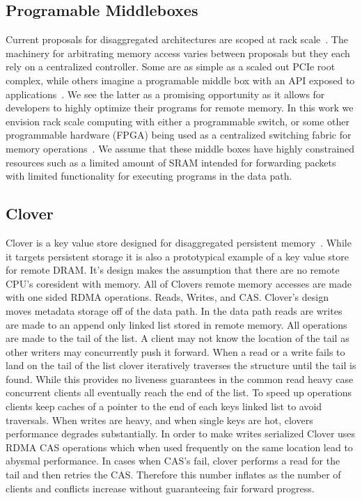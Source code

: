 \subsection{Programable Middleboxes}

Current proposals for disaggregated architectures are scoped at rack
scale~\cite{disandapp,beyond,firebox}.  The machinery for arbitrating memory
access varies between proposals but they each rely on a centralized controller.
Some are as simple as a scaled out PCIe root complex, while others imagine a
programable middle box with an API exposed to applications~\cite{disandapp}. We
see the latter as a promising opportunity as it allows for developers to highly
optimize their programs for remote memory.  In this work we envision rack scale
computing with either a programmable switch, or some other programmable hardware
(FPGA) being used as a centralized switching fabric for memory
operations~\cite{supernic}. We assume that these middle boxes have highly
constrained resources such as a limited amount of SRAM intended for forwarding
packets with limited functionality for executing programs in the data path.

\subsection{Clover}

Clover is a key value store designed for disaggregated persistent
memory~\cite{clover}. While it targets persistent storage it is also a
prototypical example of a key value store for remote DRAM. It's design makes the
assumption that there are no remote CPU's coresident with memory. All of Clovers
remote memory accesses are made with one sided RDMA operations. Reads, Writes,
and CAS. Clover's design moves metadata storage off of the data path. In the
data path reads are writes are made to an append only linked list stored in
remote memory. All operations are made to the tail of the list. A client may not
know the location of the tail as other writers may concurrently push it forward.
When a read or a write fails to land on the tail of the list clover iteratively
traverses the structure until the tail is found. While this provides no liveness
guarantees in the common read heavy case concurrent clients all eventually reach
the end of the list. To speed up operations clients keep caches of a pointer to
the end of each keys linked list to avoid traversals. When writes are heavy, and
when single keys are hot, clovers performance degrades substantially. In order
to make writes serialized Clover uses RDMA CAS operations which when used
frequently on the same location lead to abysmal performance. In cases when CAS's
fail, clover performs a read for the tail and then retries the CAS. Therefore
this number inflates as the number of clients and conflicts increase without
guaranteeing fair forward progress.
